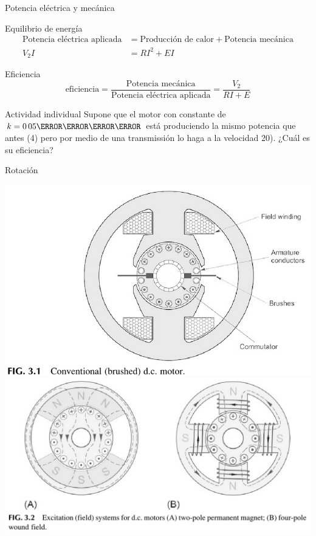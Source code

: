 \documentclass[presentation,aspectratio=169]{beamer}
\begin{document}
\begin{frame}[label={sec:org0925f5d}]{Potencia eléctrica y mecánica}
\begin{block}{Equilibrio de energía}
\begin{align*}
\text{Potencia eléctrica aplicada} &= \text{Producción de calor} + \text{Potencia mecánica}\\
V_2 I &= RI^2 + EI
\end{align*}
\end{block}
\begin{block}{Eficiencia}
\[ \text{eficiencia} = \frac{\text{Potencia mecánica}}{\text{Potencia eléctrica aplicada}} = \frac{V_2}{RI + E}\]

\alert{Actividad individual} Supone que el motor con constante de \(k=\unit{0.05}{\kilo\newton\per\ampere}\) está produciendo la mismo potencia que antes (\unit{4}{\mega\watt}) pero por medio de una transmissión lo haga a la velocidad \unit{20}{\meter\per\second}). ¿Cuál es su eficiencia?
\end{block}
\end{frame}


\begin{frame}[label={sec:org38f1281}]{Rotación}
\begin{center}
\includegraphics[width=0.4\linewidth]{../../figures/HD-fig3_1.png}
\includegraphics[width=0.53\linewidth]{../../figures/HD-fig3_2.png}
\end{center}
\end{frame}
\end{document}
